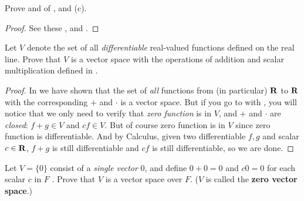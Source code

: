 \begin{exercise} \label{exercise 1.2.9}
Prove  and  of , and (c).
\end{exercise}

\begin{proof}
See these ,  and .
\end{proof}

\begin{exercise} \label{exercise 1.2.10}
Let \(V\) denote the set of all \emph{differentiable} real-valued functions defined on the real line.
Prove that \(V\) is a vector space with the operations of
addition and scalar multiplication defined in .
\end{exercise}

\begin{proof}
In  we have shown that the set of \emph{all} functions from (in particular) \(\mathbf{R}\) to \(\mathbf{R}\) with the corresponding \(+\) and \(\cdot\) is a vector space.
But if you go to  with , you will notice that we only need to verify that \emph{zero function} is in \(V\), and \(+\) and \(\cdot\) are \emph{closed}: \(f + g \in V\) and \(c f \in V\).
But of course zero function is in \(V\) since zero function is differentiable.
And by Calculus, given two differentiable \(f, g\) and scalar \(c \in \mathbf{R}\), \(f + g\) is still differentiable and \(c f\) is still differentiable, so we are done.
\end{proof}

\begin{exercise} \label{exercise 1.2.11}
Let \(V = \{ 0 \}\) consist of a \emph{single vector} \(0\), and define \(0 + 0 = 0\)  and \(c0 = 0\) for each scalar \(c\) in \(F\) .
Prove that \(V\) is a vector space over \(F\).
(\(V\) is called the \textbf{zero vector space}.)
\end{exercise}

